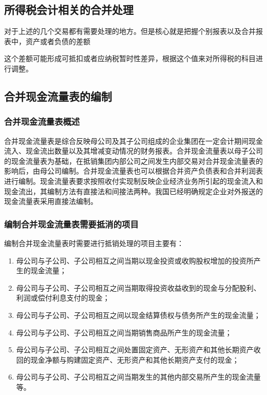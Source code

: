 \documentclass[UTF8,12pt]{ctexart}
\numberwithin{equation}{section} %
\numberwithin{figure}{section}
\numberwithin{table}{section}
\begin{document}
	\subsection{所得税会计相关的合并处理}
	对于上述的几个交易都有需要处理的地方。但是核心就是把握个别报表以及合并报表中，资产或者负债的差额
	
	这个差额可能形成可抵扣或者应纳税暂时性差异，根据这个值来对所得税的科目进行调整。
	
	\subsection{合并现金流量表的编制}
	\subsubsection{合并现金流量表概述}
	合并现金流量表是综合反映母公司及其子公司组成的企业集团在一定会计期间现金流入、现金流出数量以及其增减变动情况的财务报表。合并现金流量表以母子公司的现金流量表为基础，在抵销集团内部公司之间发生内部交易对合并现金流量表的影响后，由母公司编制。合并现金流量表也可以根据合并资产负债表和合并利润表进行编制。现金流量表要求按照收付实现制反映企业经济业务所引起的现金流入和现金流出，其编制方法有直接法和间接法两种。我国已经明确规定企业对外报送的现金流量表采用直接法编制。
	
	\subsubsection{编制合并现金流量表需要抵消的项目}
	编制合并现金流量表时需要进行抵销处理的项目主要有：
	\begin{enumerate}
		\item 母公司与子公司、子公司相互之间当期以现金投资或收购股权增加的投资所产生的现金流量；
		
		\item 母公司与子公司、子公司相互之间当期取得投资收益收到的现金与分配股利、利润或偿付利息支付的现金；
		
		\item 母公司与子公司、子公司相互之间以现金结算债权与债务所产生的现金流量；
		
		\item 母公司与子公司、子公司相互之间当期销售商品所产生的现金流量；
		
		\item 母公司与子公司、子公司相互之间处置固定资产、无形资产和其他长期资产收回的现金净额与购建固定资产、无形资产和其他长期资产支付的现金；
		
		\item 母公司与子公司、子公司相互之间当期发生的其他内部交易所产生的现金流量等。
	\end{enumerate}
	
\end{document}
